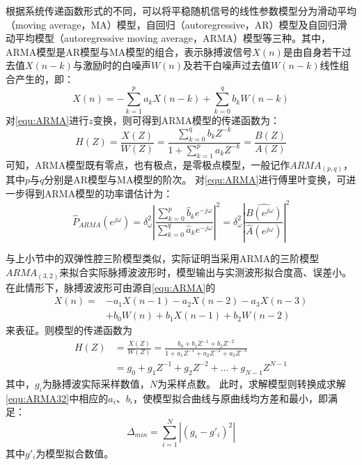 根据系统传递函数形式的不同，可以将平稳随机信号的线性参数模型分为滑动平均（moving average，MA）模型，自回归（autoregressive，AR）模型及自回归滑动平均模型（autoregressive moving average，ARMA）模型等三种。其中，
ARMA模型是AR模型与MA模型的组合，表示脉搏波信号$X(n)$是由自身若干过去值$X(n-k)$与激励时的白噪声$W(n)$及若干白噪声过去值$W(n-k)$线性组合产生的，即：
\begin{equation}
    \label{equ:ARMA}
    X(n)=-\sum_{k=1}^{p}a_{k}X(n-k)+\sum_{k=0}^{q}b_{k}W(n-k)
\end{equation}
对\autoref{equ:ARMA}进行$z$变换，则可得到ARMA模型的传递函数为：
\begin{equation}
    \label{equ:ARMAH}
    H(Z)=\frac{X(Z)}{W(Z)}=\frac{\sum_{k=0}^{q}b_{k}Z^{-k}}{1+\sum_{k=1}^{p}a_{k}Z^{-k}}=\frac{B(Z)}{A(Z)}
\end{equation}
可知，ARMA模型既有零点，也有极点，是零极点模型，一般记作$ARMA_{(p,q)}$，其中$p$与$q$分别是AR模型与MA模型的阶次。
对\autoref{equ:ARMA}进行傅里叶变换，可进一步得到ARMA模型的功率谱估计为\cite{TJXHCL}：
\begin{equation}
    \label{equ:ARMAP}
    \hat{P}_{ARMA}(e^{j\omega} )=
    \delta _{\omega}^2\left |  \frac{\sum_{k=0}^{p}\hat{b}_{k}e^{-j\omega}}{\sum_{k=0}^{q}\hat{a}_{k}e^{-j\omega}}\right |^2
    =\delta _{\omega}^2\left |  \frac{\hat{B(e^{j\omega} )}}{\hat{A}(e^{j\omega} )}\right |^2
\end{equation}

与上小节中的双弹性腔三阶模型类似，实际证明当采用ARMA的三阶模型$ARMA_{(3,2)}$来拟合实际脉搏波波形时，模型输出与实测波形拟合度高、误差小\cite{PPGYY}。在此情形下，脉搏波波形可由源自\autoref{equ:ARMA}的
\begin{equation}
    \label{equ:ARMA32}
    \begin{aligned}
        X(n)=&-a_{1}X(n-1)-a_{2}X(n-2)-a_{3}X(n-3)\\
        &+b_{0}W(n)+b_{1}X(n-1)+b_{2}W(n-2)
    \end{aligned}
\end{equation}
来表征。则模型的传递函数为
\begin{equation}
    \label{equ:ARMAH32}
    \begin{aligned}
        H(Z)&=\frac{X(Z)}{W(Z)}=\frac{b_{0}+b_{1}Z^{-1}+b_{2}Z^{-2}}{1+a_{1}Z^{-1}+a_{2}Z^{-2}+a_{3}Z^{-3}}\\
        &=g_{0}+g_{1}Z^{-1}+g_{2}Z^{-2}+...+g_{N-1}Z^{N-1}
    \end{aligned}
\end{equation}
其中，$g_{i}$为脉搏波实际采样数值，$N$为采样点数。
此时，求解模型则转换成求解\autoref{equ:ARMA32}中相应的$a_{i}$、$b_{i}$，使模型拟合曲线与原曲线均方差和最小，即满足：
\begin{equation}
    \label{equ:MeanSum}
    \Delta_{min}=\sum_{i=1}^{N}\left |  (g_i-g'_i)^2\right |
\end{equation}
其中$g'_i$为模型拟合数值。

